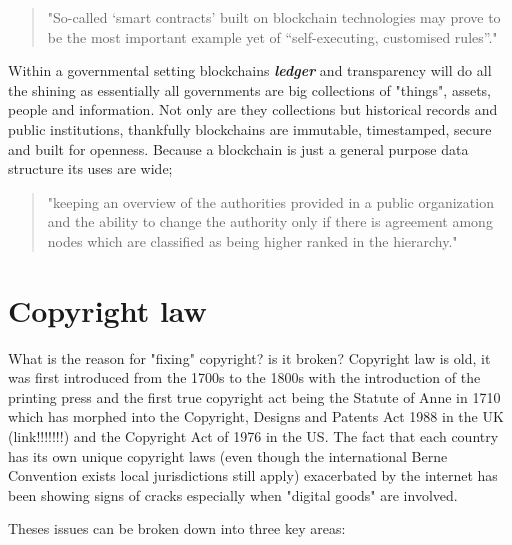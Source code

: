 \documentclass[12pt]{report}
\newcommand{\keyword}[1]{\textbf{\textit{#1}}}
\begin{document}
\begin{quote}
	"So-called ‘smart contracts’ built on blockchain technologies may prove to be the most important example yet of “self-executing, customised rules”." \cite{MILLARD2018843}
\end{quote}

Within a governmental setting blockchains \keyword{ledger} and transparency will do all the shining as essentially all governments are big collections of "things", assets, people and information. Not only are they collections but historical records and public institutions, thankfully blockchains are immutable, timestamped, secure and built for openness. Because a blockchain is just a general purpose data structure its uses are wide; \begin{quote}"keeping an overview of the authorities provided in a public organization and the ability to change the authority only if there is agreement among nodes which are classified as being higher ranked in the hierarchy." \cite{OLNES2017355}\end{quote}

\section{Copyright law}

What is the reason for "fixing" copyright? is it broken? Copyright law is old, it was first introduced from the 1700s to the 1800s with the introduction of the printing press and the first true copyright act being the Statute of Anne in 1710 which has morphed into the Copyright, Designs and Patents Act 1988 in the UK (link!!!!!!!) and the Copyright Act of 1976 in the US. The fact that each country has its own unique copyright laws (even though the international Berne Convention exists local jurisdictions still apply) exacerbated by the internet has been showing signs of cracks especially when "digital goods" are involved.

Theses issues can be broken down into three key areas: 
\end{document}
